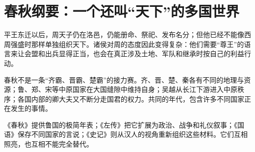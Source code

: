 \section{春秋纲要：一个还叫“天下”的多国世界}

平王东迁以后，周天子仍在洛邑，仍能册命、祭祀、发布名分；但他已经不能像西周强盛时那样单独组织天下。诸侯对周的态度因此变得复杂：他们需要“尊王”的语言来让会盟和出兵显得正当，也会在真正涉及土地、军队和继承时按自己的利益行动。

春秋不是一条“齐霸、晋霸、楚霸”的接力赛。齐、晋、楚、秦各有不同的地理与资源；鲁、郑、宋等中原国家在大国缝隙中维持自身；吴越从长江下游进入中原秩序；各国内部的卿大夫又不断分走国君的权力。共同的年代，包含许多不同国家正在发生的事情。

\begin{sourcenote}
《春秋》提供鲁国的极简年表；《左传》把它扩展为政治、战争和礼仪叙事；《国语》保存不同国家的言说；《史记》则从汉人的视角重新组织这些材料。它们互相照亮，也互相不能完全替代。
\end{sourcenote}
